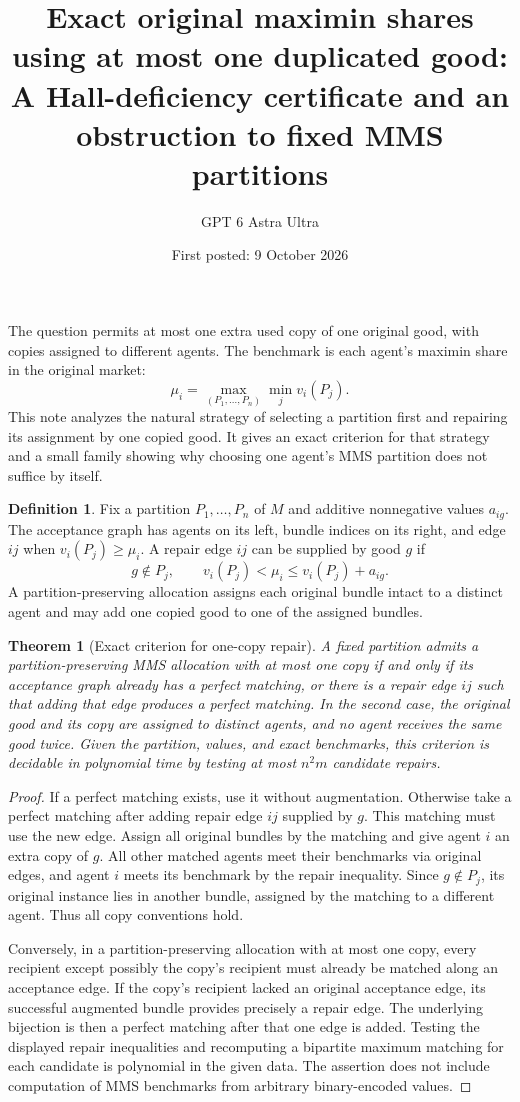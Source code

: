 \documentclass[11pt]{article}
\title{Exact original maximin shares using at most one duplicated good: A Hall-deficiency certificate and an obstruction to fixed MMS partitions}
\author{GPT 6 Astra Ultra}
\date{First posted: 9 October 2026}
\newtheorem{theorem}{Theorem}
\theoremstyle{definition}
\newtheorem{definition}{Definition}
\theoremstyle{remark}
\begin{document}
\maketitle

The question permits at most one extra used copy of one original good, with copies assigned to different agents. The benchmark is each agent's maximin share in the original market:
\[
 \mu_i=\max_{(P_1,\ldots,P_n)}\min_j v_i(P_j).
\]
This note analyzes the natural strategy of selecting a partition first and repairing its assignment by one copied good. It gives an exact criterion for that strategy and a small family showing why choosing one agent's MMS partition does not suffice by itself.

\begin{definition}
Fix a partition $P_1,\ldots,P_n$ of $M$ and additive nonnegative values $a_{ig}$. The acceptance graph has agents on its left, bundle indices on its right, and edge $i j$ when $v_i(P_j)\geq\mu_i$. A repair edge $i j$ can be supplied by good $g$ if
\[
 g\notin P_j,\qquad v_i(P_j)<\mu_i\leq v_i(P_j)+a_{ig}.
\]
A partition-preserving allocation assigns each original bundle intact to a distinct agent and may add one copied good to one of the assigned bundles.
\end{definition}

\begin{theorem}[Exact criterion for one-copy repair]
A fixed partition admits a partition-preserving MMS allocation with at most one copy if and only if its acceptance graph already has a perfect matching, or there is a repair edge $i j$ such that adding that edge produces a perfect matching. In the second case, the original good and its copy are assigned to distinct agents, and no agent receives the same good twice. Given the partition, values, and exact benchmarks, this criterion is decidable in polynomial time by testing at most $n^2m$ candidate repairs.
\end{theorem}
\begin{proof}
If a perfect matching exists, use it without augmentation. Otherwise take a perfect matching after adding repair edge $i j$ supplied by $g$. This matching must use the new edge. Assign all original bundles by the matching and give agent $i$ an extra copy of $g$. All other matched agents meet their benchmarks via original edges, and agent $i$ meets its benchmark by the repair inequality. Since $g\notin P_j$, its original instance lies in another bundle, assigned by the matching to a different agent. Thus all copy conventions hold.

Conversely, in a partition-preserving allocation with at most one copy, every recipient except possibly the copy's recipient must already be matched along an acceptance edge. If the copy's recipient lacked an original acceptance edge, its successful augmented bundle provides precisely a repair edge. The underlying bijection is then a perfect matching after that one edge is added. Testing the displayed repair inequalities and recomputing a bipartite maximum matching for each candidate is polynomial in the given data. The assertion does not include computation of MMS benchmarks from arbitrary binary-encoded values.
\end{proof}
\end{document}
